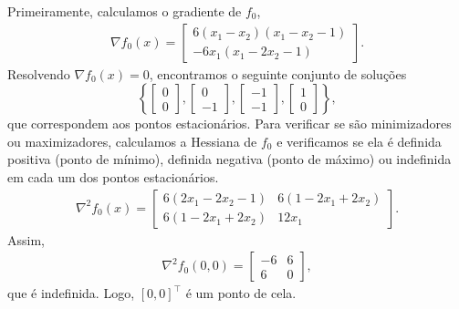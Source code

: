 \begin{questions}
\begin{solution}
	Primeiramente, calculamos o gradiente de $f_0$,
    \begin{align*}
    	\nabla f_0(x) = 
        \begin{bmatrix}
    		6(x_1-x_2)(x_1-x_2-1) \\
    		-6 x_1 (x_1-2x_2-1)
		\end{bmatrix}.
    \end{align*}
    Resolvendo $\nabla f_0(x) = 0$, encontramos o seguinte conjunto de soluções
    \[ \left\lbrace
    	\begin{bmatrix}
    		0 \\
    		0
		\end{bmatrix},
        \begin{bmatrix}
    		0 \\
    		-1
		\end{bmatrix},
    	\begin{bmatrix}
    		-1 \\
    		-1
		\end{bmatrix},
        \begin{bmatrix}
    		1 \\
    		0
		\end{bmatrix}
        \right\rbrace,
    \]
    que correspondem aos pontos estacionários. Para verificar se são minimizadores ou maximizadores, calculamos a Hessiana de $f_0$ e verificamos se ela é definida positiva (ponto de mínimo), definida negativa (ponto de máximo) ou indefinida em cada um dos pontos estacionários.
	\begin{align*}
    	\nabla^2 f_0(x) = 
        \begin{bmatrix}
    		6 (2 x_1 - 2 x_2 - 1) & 6 (1 - 2 x_1 + 2 x_2) \\
    		6 (1 - 2 x_1 + 2 x_2) & 12 x_1
		\end{bmatrix}.
    \end{align*}
    Assim,
    \begin{align*}
    	\nabla^2 f_0\left( 0, 0 \right) = 
        \begin{bmatrix}
    		-6 & 6 \\
    		6  & 0
		\end{bmatrix},
    \end{align*}
    que é indefinida. Logo, $[0, 0]^\top $ é um ponto de cela.

\end{solution}
\end{questions}
